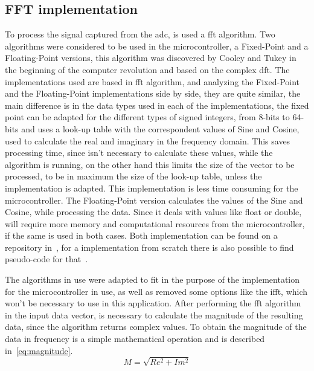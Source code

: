 \subsection{FFT implementation}\label{subsec:fftImp}
To process the signal captured from the \acrshort{adc}, is used a \acrshort{fft} algorithm. Two algorithms were considered to be used in the microcontroller, a Fixed-Point and a Floating-Point versions, this algorithm was discovered by Cooley and Tukey in the beginning of the computer revolution and based on the complex \acrshort{dft}. The implementations used are based in \acrshort{fft} algorithm, and analyzing the Fixed-Point and the Floating-Point implementations side by side, they are quite similar, the main difference is in the data types used in each of the implementations, the fixed point can be adapted for the different types of signed integers, from 8-bits to 64-bits and uses a look-up table with the correspondent values of Sine and Cosine, used to calculate the real and imaginary in the frequency domain. This saves processing time, since isn't necessary to calculate these values, while the algorithm is running, on the other hand this limits the size of the vector to be processed, to be in maximum the size of the look-up table, unless the implementation is adapted. This implementation is less time consuming for the microcontroller. The Floating-Point version calculates the values of the Sine and Cosine, while processing the data. Since it deals with values like float or double, will require more memory and computational resources from the microcontroller, if the same is used in both cases. Both implementation can be found on a repository in~\cite{262588213843476FixFft,Dannyf00FloatingPointFFTBenchmarka}, for a implementation from scratch there is also possible to find pseudo-code for that~\cite{smith1997scientist}.

The algorithms in use were adapted to fit in the purpose of the implementation for the microcontroller in use, as well as removed some options like the \acrshort{ifft}, which won't be necessary to use in this application.
After performing the \acrshort{fft} algorithm in the input data vector, is necessary to calculate the magnitude of the resulting data, since the algorithm returns complex values. To obtain the magnitude of the data in frequency is a simple mathematical operation and is described in~\ref{eq:magnitude}.
\begin{equation}\label{eq:magnitude}
    M = \sqrt{Re^2 + Im^2}
\end{equation}
